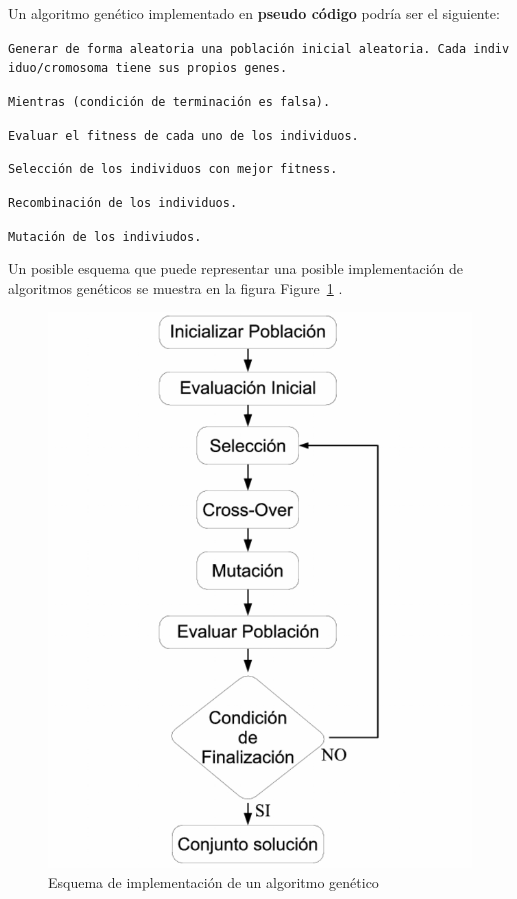 \documentclass[
  a4paper,
  DIV=11,
  numbers=noendperiod]{scrreprt}
\begin{document}
Un algoritmo genético implementado en \textbf{pseudo código} podría ser
el siguiente:

\texttt{Generar\ de\ forma\ aleatoria\ una\ población\ inicial\ aleatoria.\ Cada\ individuo/cromosoma\ tiene\ sus\ propios\ genes.}

\texttt{Mientras\ (condición\ de\ terminación\ es\ falsa).}

\texttt{Evaluar\ el\ fitness\ de\ cada\ uno\ de\ los\ individuos.}

\texttt{Selección\ de\ los\ individuos\ con\ mejor\ fitness.}

\texttt{Recombinación\ de\ los\ individuos.}

\texttt{Mutación\ de\ los\ indiviudos.}

Un posible esquema que puede representar una posible implementación de
algoritmos genéticos se muestra en la figura
Figure~\ref{fig-esquema-genetico} .

\begin{figure}

{\centering \includegraphics{imagenes/capitulo3/esquema_genetico.png}

}

\caption{\label{fig-esquema-genetico}Esquema de implementación de un
algoritmo genético}

\end{figure}
\end{document}
